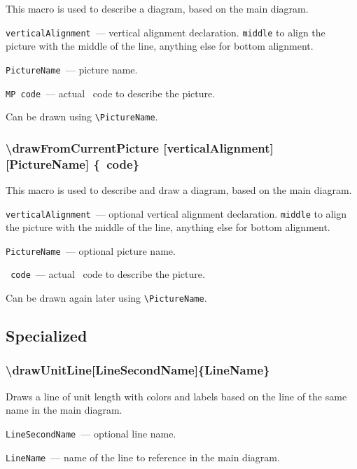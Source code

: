 \fussy

	This macro is used to describe a diagram, based on the main diagram.

	\texttt{verticalAlignment}~— vertical alignment declaration. \texttt{middle} to align the picture with the middle of the line, anything else for bottom alignment.

	\texttt{PictureName}~— picture name.

	\texttt{MP code}~— actual \METAPOST\ code to describe the picture.
	
	Can be drawn using \texttt{\textbackslash PictureName}.
	
\sloppy

\subsubsection{\textbackslash drawFromCurrentPicture [verticalAlignment] [PictureName] \{\METAPOST\nolinebreak\ code\}}
 
 \fussy
  
	This macro is used to describe and draw a diagram, based on the main diagram.

	\texttt{verticalAlignment}~— optional vertical alignment declaration. \texttt{middle} to align the picture with the middle of the line, anything else for bottom alignment.

	\texttt{PictureName}~— optional picture name.

	\texttt{\METAPOST\ code}~— actual \METAPOST\ code to describe the picture.
	
	Can be drawn again later using \texttt{\textbackslash PictureName}.


\subsection{Specialized}

\subsubsection{\textbackslash drawUnitLine[LineSecondName]\{LineName\}}

	Draws a line of unit length with colors and labels based on the line of the same name in the main diagram.

	\texttt{LineSecondName}~— optional line name.
	
	\texttt{LineName}~— name of the line to reference in the main diagram. 

